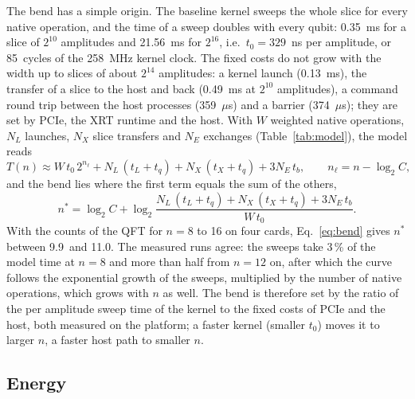 \documentclass[pdflatex,sn-mathphys-num]{sn-jnl}
\newcommand{\NumBarrierUs}{374}
\newcommand{\NumClockVsix}{258}
\newcommand{\NumModelCrossN}{12}
\newcommand{\NumModelNstarMax}{11.0}
\newcommand{\NumModelNstarMin}{9.9}
\newcommand{\NumModelSweepShareEight}{3}
\newcommand{\NumQueueRttUs}{359}
\newcommand{\NumVsixCyclesPerAmp}{85}
\newcommand{\NumVsixLaunchMsTen}{0.13}
\newcommand{\NumVsixNsPerAmp}{329}
\newcommand{\NumVsixSweepMsSixteen}{21.56}
\newcommand{\NumVsixSweepMsTen}{0.35}
\newcommand{\NumVsixXferMsTen}{0.49}
\theoremstyle{thmstyleone}
\theoremstyle{thmstylethree}
\begin{document}
The bend has a simple origin. The baseline kernel sweeps the whole slice for every native operation, and the time of a
sweep doubles with every qubit: \NumVsixSweepMsTen~ms for a slice of $2^{10}$ amplitudes and \NumVsixSweepMsSixteen~ms for
$2^{16}$, i.e.\ $t_0 = \NumVsixNsPerAmp$~ns per amplitude, or \NumVsixCyclesPerAmp~cycles of the
\NumClockVsix~MHz kernel clock. The fixed costs do not grow with the width up to slices of about $2^{14}$ amplitudes: a
kernel launch (\NumVsixLaunchMsTen~ms), the transfer of a slice to the host and back (\NumVsixXferMsTen~ms at
$2^{10}$ amplitudes), a command round trip between the host processes (\NumQueueRttUs~$\mu$s) and a barrier
(\NumBarrierUs~$\mu$s); they are set by PCIe, the XRT runtime and the host. With $W$ weighted native operations,
$N_L$ launches, $N_X$ slice transfers and $N_E$ exchanges (Table~\ref{tab:model}), the model reads
\begin{equation}
T(n) \approx W\,t_0\,2^{n_\ell} + N_L\,(t_L + t_q) + N_X\,(t_X + t_q) + 3N_E\,t_b, \qquad n_\ell = n - \log_2 C,
\label{eq:model}
\end{equation}
and the bend lies where the first term equals the sum of the others,
\begin{equation}
n^\ast = \log_2 C + \log_2 \frac{N_L\,(t_L + t_q) + N_X\,(t_X + t_q) + 3N_E\,t_b}{W\,t_0}.
\label{eq:bend}
\end{equation}
With the counts of the QFT for $n=8$ to 16 on four cards, Eq.~\eqref{eq:bend} gives $n^\ast$ between
\NumModelNstarMin~and \NumModelNstarMax. The measured runs agree: the sweeps take \NumModelSweepShareEight\,\% of the model
time at $n=8$ and more than half from $n=\NumModelCrossN$ on, after which the curve follows the exponential growth of the
sweeps, multiplied by the number of native operations, which grows with $n$ as well. The bend is therefore set by the
ratio of the per amplitude sweep time of the kernel to the fixed costs of PCIe and the host, both measured on the
platform; a faster kernel (smaller $t_0$) moves it to larger $n$, a faster host path to smaller $n$.

\subsection{Energy}\label{subsec:res-energy}
\end{document}
